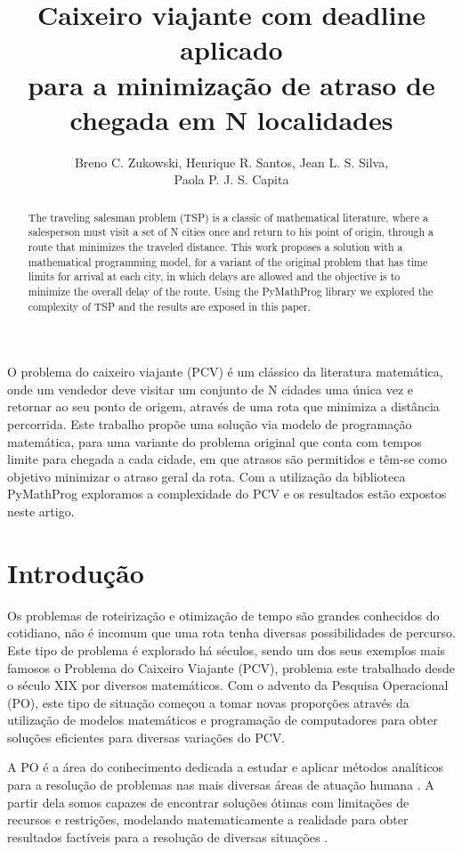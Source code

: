 \documentclass[12pt]{article}
\title{Caixeiro viajante com deadline aplicado\\ para a minimização de atraso de chegada em N localidades}
\author{Breno C. Zukowski\inst{1}, Henrique R. Santos\inst{1}, Jean L. S. Silva\inst{1}, \\ Paola P. J. S. Capita\inst{1}}
\begin{document}
\maketitle
\begin{abstract}
  The traveling salesman problem (TSP) is a classic of mathematical literature, where a salesperson must visit a set of N cities once and return to his point of origin, through a route that minimizes the traveled distance. This work proposes a solution with a mathematical programming model, for a variant of the original problem that has time limits for arrival at each city, in which delays are allowed and the objective is to minimize the overall delay of the route. Using the PyMathProg library we explored the complexity of TSP and the results are exposed in this paper.\end{abstract}

\begin{resumo}
  O problema do caixeiro viajante (PCV) é um clássico da literatura matemática, onde um vendedor deve visitar um conjunto de N cidades uma única vez e retornar ao seu ponto de origem, através de uma rota que minimiza a distância percorrida. Este trabalho propõe uma solução via modelo de programação matemática, para uma variante do problema original que conta com tempos limite para chegada a cada cidade, em que atrasos são permitidos e têm-se como objetivo minimizar o atraso geral da rota. Com a utilização da biblioteca PyMathProg exploramos a complexidade do PCV e os resultados estão expostos neste artigo.
\end{resumo}


\section{Introdução}
Os problemas de roteirização e otimização de tempo são grandes conhecidos do cotidiano, não é incomum que uma rota tenha diversas possibilidades de percurso. Este tipo de problema é explorado há séculos, sendo um dos seus exemplos mais famosos o Problema do Caixeiro Viajante (PCV), problema este trabalhado desde o século XIX por diversos matemáticos. Com o advento da Pesquisa Operacional (PO), este tipo de situação começou a tomar novas proporções através da utilização de modelos matemáticos e programação de computadores para obter soluções eficientes para diversas variações do PCV.

A PO é a área do conhecimento dedicada a estudar e aplicar métodos analíticos para a resolução de problemas nas mais diversas áreas de atuação humana \cite{sobrapo2017}. A partir dela somos capazes de encontrar soluções ótimas com limitações de recursos e restrições, modelando matematicamente a realidade para obter resultados factíveis para a resolução de diversas situações \cite{hillier2013introdução}.
\end{document}
